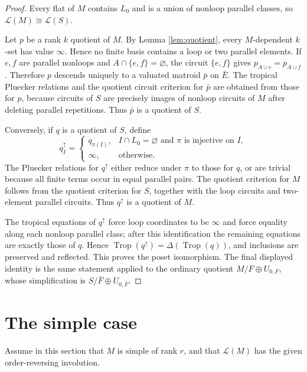 \documentclass[12pt]{article}
\theoremstyle{definition}
\newcommand{\Trop}{\operatorname{Trop}}
\newcommand{\cL}{\mathcal L}
\begin{document}
\begin{proof}
Every flat of \(M\) contains \(L_0\) and is a union of nonloop parallel classes, so \(\cL(M)\cong\cL(S)\).

Let \(p\) be a rank \(k\) quotient of \(M\).  By Lemma \ref{lem:quotient}, every \(M\)-dependent \(k\)-set has value \(\infty\).  Hence no finite basis contains a loop or two parallel elements.  If \(e,f\) are parallel nonloops and \(A\cap\{e,f\}=\varnothing\), the circuit \(\{e,f\}\) gives \(p_{A\cup e}=p_{A\cup f}\).  Therefore \(p\) descends uniquely to a valuated matroid \(\bar p\) on \(\bar E\).  The tropical Pluecker relations and the quotient circuit criterion for \(\bar p\) are obtained from those for \(p\), because circuits of \(S\) are precisely images of nonloop circuits of \(M\) after deleting parallel repetitions.  Thus \(\bar p\) is a quotient of \(S\).

Conversely, if \(q\) is a quotient of \(S\), define
\[
q^\uparrow_I=
\begin{cases}
q_{\pi(I)},& I\cap L_0=\varnothing\text{ and }\pi\text{ is injective on }I,\\
\infty,&\text{otherwise}.
\end{cases}
\]
The Pluecker relations for \(q^\uparrow\) either reduce under \(\pi\) to those for \(q\), or are trivial because all finite terms occur in equal parallel pairs.  The quotient criterion for \(M\) follows from the quotient criterion for \(S\), together with the loop circuits and two-element parallel circuits.  Thus \(q^\uparrow\) is a quotient of \(M\).

The tropical equations of \(q^\uparrow\) force loop coordinates to be \(\infty\) and force equality along each nonloop parallel class; after this identification the remaining equations are exactly those of \(q\).  Hence \(\Trop(q^\uparrow)=\Delta(\Trop(q))\), and inclusions are preserved and reflected.  This proves the poset isomorphism.  The final displayed identity is the same statement applied to the ordinary quotient \(M/F\oplus U_{0,F}\), whose simplification is \(S/\bar F\oplus U_{0,\bar F}\).
\end{proof}

\section*{The simple case}

Assume in this section that \(M\) is simple of rank \(r\), and that \(\cL(M)\) has the given order-reversing involution.
\end{document}
